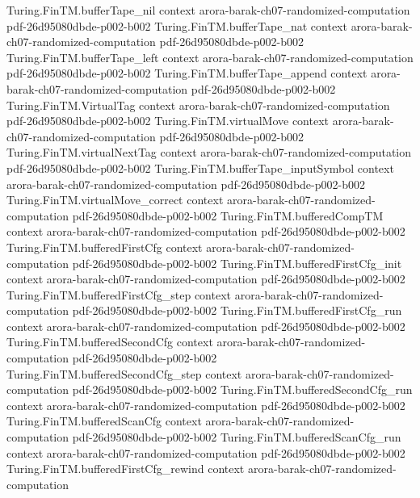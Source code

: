 \begin{theorem}
\proofstep
  {Turing.FinTM.bufferTape_nil}
  {context}
  {arora-barak-ch07-randomized-computation}
  {pdf-26d95080dbde-p002-b002}
\proofstep
  {Turing.FinTM.bufferTape_nat}
  {context}
  {arora-barak-ch07-randomized-computation}
  {pdf-26d95080dbde-p002-b002}
\proofstep
  {Turing.FinTM.bufferTape_left}
  {context}
  {arora-barak-ch07-randomized-computation}
  {pdf-26d95080dbde-p002-b002}
\proofstep
  {Turing.FinTM.bufferTape_append}
  {context}
  {arora-barak-ch07-randomized-computation}
  {pdf-26d95080dbde-p002-b002}
\proofstep
  {Turing.FinTM.VirtualTag}
  {context}
  {arora-barak-ch07-randomized-computation}
  {pdf-26d95080dbde-p002-b002}
\proofstep
  {Turing.FinTM.virtualMove}
  {context}
  {arora-barak-ch07-randomized-computation}
  {pdf-26d95080dbde-p002-b002}
\proofstep
  {Turing.FinTM.virtualNextTag}
  {context}
  {arora-barak-ch07-randomized-computation}
  {pdf-26d95080dbde-p002-b002}
\proofstep
  {Turing.FinTM.bufferTape_inputSymbol}
  {context}
  {arora-barak-ch07-randomized-computation}
  {pdf-26d95080dbde-p002-b002}
\proofstep
  {Turing.FinTM.virtualMove_correct}
  {context}
  {arora-barak-ch07-randomized-computation}
  {pdf-26d95080dbde-p002-b002}
\proofstep
  {Turing.FinTM.bufferedCompTM}
  {context}
  {arora-barak-ch07-randomized-computation}
  {pdf-26d95080dbde-p002-b002}
\proofstep
  {Turing.FinTM.bufferedFirstCfg}
  {context}
  {arora-barak-ch07-randomized-computation}
  {pdf-26d95080dbde-p002-b002}
\proofstep
  {Turing.FinTM.bufferedFirstCfg_init}
  {context}
  {arora-barak-ch07-randomized-computation}
  {pdf-26d95080dbde-p002-b002}
\proofstep
  {Turing.FinTM.bufferedFirstCfg_step}
  {context}
  {arora-barak-ch07-randomized-computation}
  {pdf-26d95080dbde-p002-b002}
\proofstep
  {Turing.FinTM.bufferedFirstCfg_run}
  {context}
  {arora-barak-ch07-randomized-computation}
  {pdf-26d95080dbde-p002-b002}
\proofstep
  {Turing.FinTM.bufferedSecondCfg}
  {context}
  {arora-barak-ch07-randomized-computation}
  {pdf-26d95080dbde-p002-b002}
\proofstep
  {Turing.FinTM.bufferedSecondCfg_step}
  {context}
  {arora-barak-ch07-randomized-computation}
  {pdf-26d95080dbde-p002-b002}
\proofstep
  {Turing.FinTM.bufferedSecondCfg_run}
  {context}
  {arora-barak-ch07-randomized-computation}
  {pdf-26d95080dbde-p002-b002}
\proofstep
  {Turing.FinTM.bufferedScanCfg}
  {context}
  {arora-barak-ch07-randomized-computation}
  {pdf-26d95080dbde-p002-b002}
\proofstep
  {Turing.FinTM.bufferedScanCfg_run}
  {context}
  {arora-barak-ch07-randomized-computation}
  {pdf-26d95080dbde-p002-b002}
\proofstep
  {Turing.FinTM.bufferedFirstCfg_rewind}
  {context}
  {arora-barak-ch07-randomized-computation}

\end{theorem}
